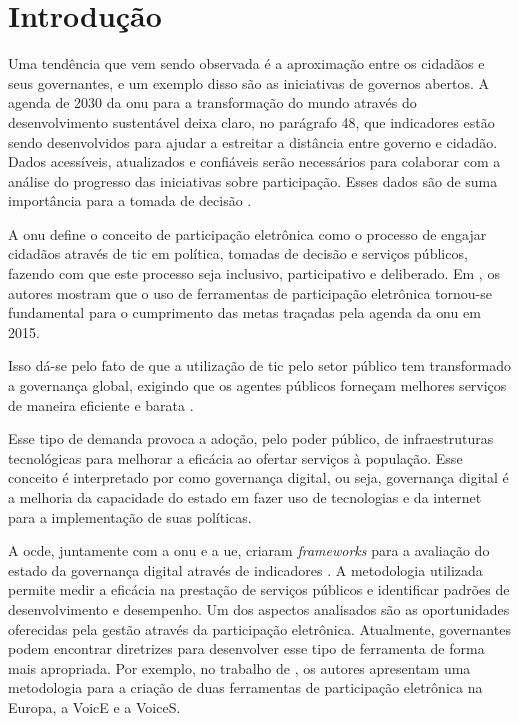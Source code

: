 \chapter[Introdução]{Introdução}
\label{cap:cap1}
Uma tendência que vem sendo observada é a aproximação entre os cidadãos e seus governantes, e um exemplo disso são as iniciativas de governos abertos.
A agenda de 2030 da \acrfull{onu} para a transformação do mundo através do desenvolvimento sustentável deixa claro, no parágrafo 48, que
indicadores estão sendo desenvolvidos para ajudar a estreitar a distância entre governo e cidadão. Dados acessíveis, atualizados e confiáveis serão necessários para colaborar 
com a análise do progresso das iniciativas sobre participação. 
Esses dados são de suma importância para a tomada de decisão \cite{assembly2015transforming}.

\par
A \acrshort{onu} define o conceito de participação eletrônica como o processo de engajar cidadãos através de \acrfull{tic} em política, tomadas de decisão e
serviços públicos, fazendo com que este processo seja inclusivo, participativo e deliberado. Em , os autores mostram que o uso de 
ferramentas de participação eletrônica tornou-se fundamental para o cumprimento das metas traçadas pela agenda da \acrshort{onu} em 2015. 

\par
Isso dá-se pelo fato de que a utilização de \acrshort{tic} pelo setor público tem transformado a governança global, exigindo que os agentes públicos forneçam melhores serviços 
de maneira eficiente e barata \cite{afdb2014uneca}. 

\par
Esse tipo de demanda provoca a adoção, pelo poder público, de infraestruturas tecnológicas para melhorar a eficácia ao ofertar serviços à população. Esse conceito é interpretado
por  como governança digital, ou seja, governança digital é a melhoria da capacidade do estado em fazer uso de tecnologias e da internet 
para a implementação de suas políticas.

\par
A \acrfull{ocde}, juntamente com a \acrshort{onu} e a \acrfull{ue}, criaram \textit{frameworks} para a avaliação do estado da governança digital através de indicadores \cite{onu2018}. A metodologia utilizada permite medir a eficácia na prestação de serviços públicos e identificar padrões de desenvolvimento e desempenho. Um dos aspectos analisados são as oportunidades oferecidas pela gestão através da participação eletrônica. 
Atualmente, governantes podem encontrar diretrizes para desenvolver esse tipo de ferramenta de forma mais apropriada.
Por exemplo,  no trabalho de , os autores apresentam uma metodologia para a criação de duas ferramentas de participação eletrônica na Europa, a VoicE e a VoiceS.

